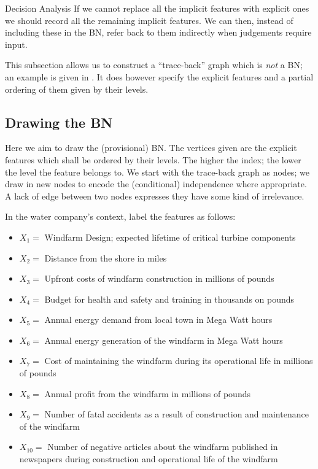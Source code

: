 \begin{chapter}{Decision Analysis \label{Ch:decision}}
If we cannot replace all the implicit features with explicit ones we should record all the remaining implicit features. We can then, instead of including these in the BN, refer back to them indirectly when judgements require input.

This subsection allows us to construct a ``trace-back'' graph which is \textit{not} a BN; an example is given in . It does however specify the explicit features and a partial ordering of them given by their levels.

\subsection{Drawing the BN}

Here we aim to draw the (provisional) BN. The vertices given are the explicit features which shall be ordered by their levels. The higher the index; the lower the level the feature belongs to. We start with the trace-back graph as nodes; we draw in new nodes to encode the (conditional) independence where appropriate. A lack of edge between two nodes expresses they have some kind of irrelevance.

In the water company's context, label the features as follows:

\begin{itemize}

	\item{ $X_1 =$ Windfarm Design; expected lifetime of critical turbine components}
	\item{ $X_2 =$ Distance from the shore in miles}
	\item{ $X_3 =$ Upfront costs of windfarm construction in millions of pounds}
	\item{ $X_4 =$ Budget for health and safety and training in thousands on pounds}
	\item{ $X_5 =$ Annual energy demand from local town in Mega Watt hours}
	\item{ $X_6 =$ Annual energy generation of the windfarm in Mega Watt hours}
	\item{ $X_7 =$ Cost of maintaining the windfarm during its operational life in millions of pounds}
	\item{ $X_8 =$ Annual profit from the windfarm in millions of pounds}
	\item{ $X_9 =$ Number of fatal accidents as a result of construction and maintenance of the windfarm}
	\item{ $X_{10} =$ Number of negative articles about the windfarm published in newspapers during construction and operational life of the windfarm}


\end{itemize}
\end{chapter}
